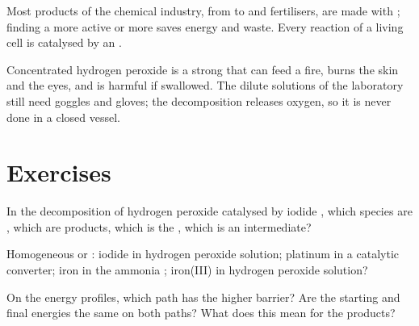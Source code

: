 \begin{remark}\label{rem:g12:catalysis:everywhere}
Most products of the chemical industry, from  to  and
fertilisers, are made with ; finding a more active or more
 saves energy and waste. Every reaction of a living
cell is catalysed by an .
\end{remark}

\begin{safety}{}
Concentrated hydrogen peroxide is a strong  that can feed a fire,
burns the skin and the eyes, and is harmful if swallowed. The dilute
solutions of the laboratory still need goggles and gloves; the
decomposition releases oxygen, so it is never done in a closed vessel.
\end{safety}

\section{Exercises}


\begin{exercise}[$\star$]\label{exo:g12:catalysis:1}
In the decomposition of hydrogen peroxide catalysed by iodide , which
species are , which are products, which is the , which
is an intermediate?
\end{exercise}

\begin{exercise}[$\star$]\label{exo:g12:catalysis:2}
Homogeneous or : iodide  in hydrogen peroxide
solution; platinum in a catalytic converter; iron in the ammonia
; iron(III)  in hydrogen peroxide solution?
\end{exercise}

\begin{exercise}[$\star$]\label{exo:g12:catalysis:3}
On the energy profiles, which path has the higher barrier? Are the
starting and final energies the same on both paths? What does this mean
for the products?
\end{exercise}

